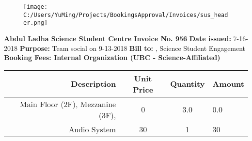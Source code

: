 \documentclass{article}%
\begin{document}
%
\normalsize%
\noindent%


\begin{figure}[h!]%
\centering%
\texttt{[image: C:/Users/YuMing/Projects/BookingsApproval/Invoices/sus\_header.png]}%
\end{figure}

%
\textbf{ }%
\newline%
\textbf{Abdul Ladha Science Student Centre Invoice No. 956}%
\newline%
\textbf{Date issued: }%
7{-}16{-}2018%
\newline%
\textbf{Purpose: }%
Team social on 9{-}13{-}2018%
\newline%
\textbf{Bill to: }%
, Science Student Engagement%
\newline%
\newline%
\textbf{Booking Fees: Internal Organization (UBC {-} Science{-}Affiliated)}%
\newline%
\begin{tabular}{rc|cl}%
\hline%
Description&Unit Price&Quantity&Amount\\%
\hline%
Main Floor (2F), Mezzanine (3F),&0&3.0&0.0\\%
\hline%
Audio System&30&1&30\\%
\hline%
\end{tabular}%
\end{document}
